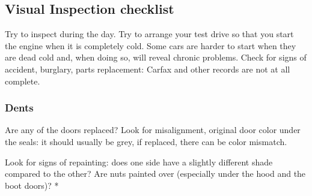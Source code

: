 \documentclass[oneside, article]{memoir}
\begin{document}
\subsection{Visual Inspection checklist}

Try to inspect during the day. Try to arrange your test drive so that you start the engine when it is completely cold. Some cars are harder to start when they are dead cold and, when doing so, will reveal chronic problems.
Check for signs of accident, burglary, parts replacement:
Carfax and other records are not at all complete.

\subsubsection{Dents}
Are any of the doors replaced? Look for misalignment, original door color under the seals: it should usually be grey, if replaced, there can be color mismatch.

Look for signs of repainting: does one side have a slightly different shade compared to the other? Are nuts painted over (especially under the hood and the boot doors)?
    *
\end{document}
